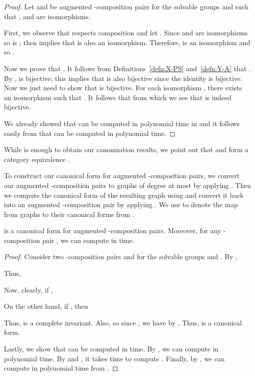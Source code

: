 \begin{proof}
  Let  and  be augmented -composition pairs for the solvable groups  and  such that ,  and  are isomorphisms.
  
  First, we observe that  respects composition and let .  Since  and  are isomorphisms so is ;  then implies that  is also an isomorphism.  Therefore,  is an isomorphism and so .

  Now we prove that .  It follows from Definitions~\ref{defn:X-PS} and~\ref{defn:Y-A} that \inpuborpriv{}{}.  By ,  is bijective; this implies that  is also bijective since the identity is bijective.  Now we just need to show that  is bijective.  For each isomorphism , there exists an isomorphism  such that .  It follows that  from which we see that  is indeed bijective.

  We already showed that  can be computed in polynomial time in  and it follows easily from  that  can be computed in polynomial time.
\end{proof}

While  is enough to obtain our canonization results, we point out that  and  form a category equivalence .

To construct our canonical form for augmented -composition pairs, we convert our augmented -composition pairs to graphs of degree at most  by applying .  Then we compute the canonical form of the resulting graph using  and convert it back into an augmented -composition pair by applying .  We use  to denote the map from graphs to their canonical forms from .

\begin{theorem}
  \label{thm:aug-alpha-can}
   is a canonical form for augmented -composition pairs.  Moreover, for any -composition pair , we can compute  in  time.
\end{theorem}

\begin{proof}
  Consider two -composition pairs  and  for the solvable groups  and .  By ,  \ifft 
  
Thus,  \ifft

Now, clearly, if ,

On the other hand, if , then

 Thus,  is a complete invariant.  Also,  so since , we have  by .  Thus,  is a canonical form.

  Lastly, we show that  can be computed in  time.  By , we can compute  in polynomial time.  By  and , it takes  time to compute .  Finally, by , we can compute  in polynomial time from .
\end{proof}
